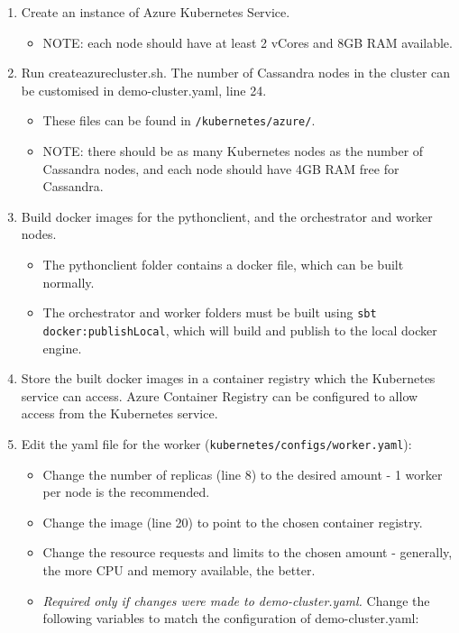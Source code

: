 \begin{enumerate}
	\item Create an instance of Azure Kubernetes Service.
	\begin{itemize}
		\item NOTE: each node should have at least 2 vCores and 8GB RAM available.
	\end{itemize}
	\item Run create\textunderscore azure\textunderscore cluster.sh. The number of Cassandra nodes in the cluster can be customised in demo-cluster.yaml, line 24.
	\begin{itemize}
		\item These files can be found in \texttt{/kubernetes/azure/}.
		\item NOTE: there should be as many Kubernetes nodes as the number of Cassandra nodes, and each node should have 4GB RAM free for Cassandra.
	\end{itemize}
	\item Build docker images for the python\textunderscore client, and the orchestrator and worker nodes.
	\begin{itemize}
		\item The python\textunderscore client folder contains a docker file, which can be built normally.
		\item The orchestrator and worker folders must be built using \texttt{sbt docker:publishLocal}, which will build and publish to the local docker engine.
	\end{itemize}
	\item Store the built docker images in a container registry which the Kubernetes service can access. Azure Container Registry can be configured to allow access from the Kubernetes service.
	\item Edit the yaml file for the worker (\texttt{kubernetes/configs/worker.yaml}):
	\begin{itemize}
		\item Change the number of replicas (line 8) to the desired amount - 1 worker per node is the recommended.
		\item Change the image (line 20) to point to the chosen container registry.
		\item Change the resource requests and limits to the chosen amount - generally, the more CPU and memory available, the better.
		\item \textit{Required only if changes were made to demo-cluster.yaml.} Change the following variables to match the configuration of demo-cluster.yaml:

\end{itemize}
\end{enumerate}
